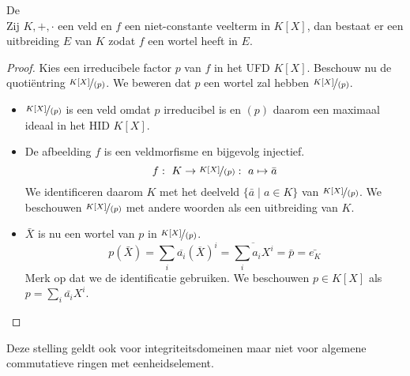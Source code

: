 \documentclass[main.tex]{subfiles}
\begin{document}
\begin{st}
  \examen
  De \\
  Zij $K,+,\cdot$ een veld en $f$ een niet-constante veelterm in $K[X]$, dan bestaat er een uitbreiding $E$ van $K$ zodat $f$ een wortel heeft in $E$.

  \begin{proof}
    Kies een irreducibele factor $p$ van $f$ in het UFD $K[X]$.
    Beschouw nu de quoti\"entring $\nicefrac{K[X]}{(p)}$.
    We beweren dat $p$ een wortel zal hebben $\nicefrac{K[X]}{(p)}$.
    \begin{itemize}
    \item $\nicefrac{K[X]}{(p)}$ is een veld omdat $p$ irreducibel is en $(p)$ daarom een maximaal ideaal in het HID $K[X]$.
    \item De afbeelding $f$ is een veldmorfisme en bijgevolg injectief.
      \[ f:\ K \rightarrow \nicefrac{K[X]}{(p)}:\ a \mapsto \bar{a} \]
      We identificeren daarom $K$ met het deelveld $\{ \bar{a} \mid a\in K \}$ van $\nicefrac{K[X]}{(p)}$.
      We beschouwen $\nicefrac{K[X]}{(p)}$ met andere woorden als een uitbreiding van $K$.
    \item $\bar{X}$ is nu een wortel van $p$ in $\nicefrac{K[X]}{(p)}$.
      \[ p(\bar{X}) = \sum_{i}\overline{a_{i}}(\overline{X})^{i}= \overline{\sum_{i}a_{i}X^{i}} = \bar{p} = \bar{e_{K}} \]
      Merk op dat we de identificatie gebruiken.
      We beschouwen $p\in K[X]$ als $p = \sum_{i}\bar{a_{i}}X^{i}$.
    \end{itemize}
  \end{proof}
\end{st}

\begin{opm}
  Deze stelling geldt ook voor integriteitsdomeinen
  maar niet voor algemene commutatieve ringen met eenheidselement.
\end{opm}
\end{document}
